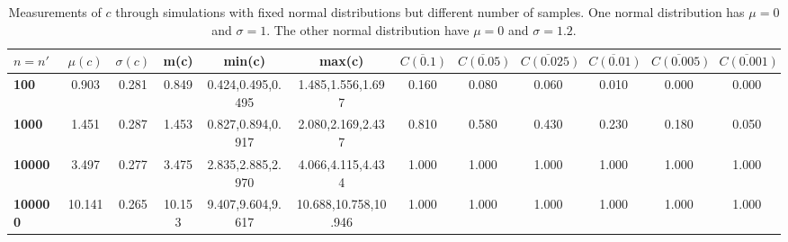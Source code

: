 \begin{table*}[h!]
\begin{center}
\begin{tabular}{| l | c | c | c | c | c | c | c | c | c | c | c |}\hline
$n=n'$ & $\mu(c)$ & $\sigma(c)$ & m(c) & min(c) & max(c) & $\overline{C(0.1)}$ & $\overline{C(0.05)}$ & $\overline{C(0.025)}$ & $\overline{C(0.01)}$ & $\overline{C(0.005)}$ & $\overline{C(0.001)}$ \\\hline\hline
{\bf 100} & 0.903 & 0.281 & 0.849 & 0.424,0.495,0.495 & 1.485,1.556,1.697 & 0.160 & 0.080 & 0.060 & 0.010 & 0.000 & 0.000 \\\hline
{\bf 1000} & 1.451 & 0.287 & 1.453 & 0.827,0.894,0.917 & 2.080,2.169,2.437 & 0.810 & 0.580 & 0.430 & 0.230 & 0.180 & 0.050 \\\hline
{\bf 10000} & 3.497 & 0.277 & 3.475 & 2.835,2.885,2.970 & 4.066,4.115,4.434 & 1.000 & 1.000 & 1.000 & 1.000 & 1.000 & 1.000 \\\hline
{\bf 100000} & 10.141 & 0.265 & 10.153 & 9.407,9.604,9.617 & 10.688,10.758,10.946 & 1.000 & 1.000 & 1.000 & 1.000 & 1.000 & 1.000 \\\hline
\end{tabular}
\caption{Measurements of $c$ through simulations
        with fixed normal distributions but different number of samples.
        One normal distribution has $\mu=0$ and $\sigma=1$.
        The other normal distribution have
        $\mu=0$ and $\sigma=1.2$.}
\end{center}
\end{table*}
